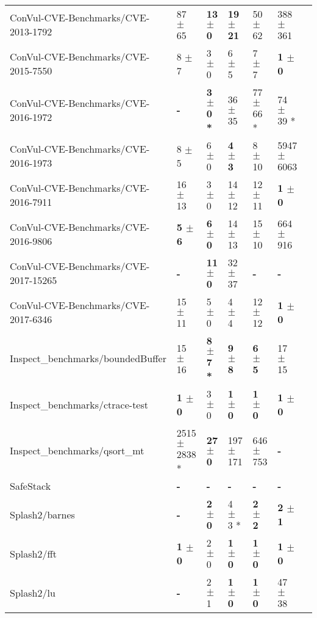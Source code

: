 \begin{table}
\begin{spacing}{1.5}
\begin{tabular}{lllllll}
ConVul-CVE-Benchmarks/CVE-2013-1792 & 87  $\pm$ 65  & \textbf{ 13  $\pm$ 0  } & \textbf{ 19  $\pm$ 21  } & 50  $\pm$ 62  & 388  $\pm$ 361  \\
ConVul-CVE-Benchmarks/CVE-2015-7550 & 8  $\pm$ 7  & 3  $\pm$ 0  & 6  $\pm$ 5  & 7  $\pm$ 7  & \textbf{ 1  $\pm$ 0  } \\
ConVul-CVE-Benchmarks/CVE-2016-1972 & \textbf{ - } & \textbf{ 3  $\pm$ 0 * } & 36  $\pm$ 35  & 77  $\pm$ 66 * & 74  $\pm$ 39 *  \\
ConVul-CVE-Benchmarks/CVE-2016-1973 & 8  $\pm$ 5  & 6  $\pm$ 0  & \textbf{ 4  $\pm$ 3  } & 8  $\pm$ 10  & 5947  $\pm$ 6063   \\
ConVul-CVE-Benchmarks/CVE-2016-7911 & 16  $\pm$ 13  & 3  $\pm$ 0  & 14  $\pm$ 12  & 12  $\pm$ 11  & \textbf{ 1  $\pm$ 0  }  \\
ConVul-CVE-Benchmarks/CVE-2016-9806 & \textbf{ 5  $\pm$ 6  } & \textbf{ 6  $\pm$ 0  } & 14  $\pm$ 13  & 15  $\pm$ 10  & 664  $\pm$ 916   \\
ConVul-CVE-Benchmarks/CVE-2017-15265 & \textbf{ - } & \textbf{ 11  $\pm$ 0  } & 32  $\pm$ 37  & \textbf{ - } & \textbf{ - }  \\
ConVul-CVE-Benchmarks/CVE-2017-6346 & 15  $\pm$ 11  & 5  $\pm$ 0  & 4  $\pm$ 4  & 12  $\pm$ 12  & \textbf{ 1  $\pm$ 0  }  \\
Inspect\_benchmarks/boundedBuffer & 15  $\pm$ 16  & \textbf{ 8  $\pm$ 7 * } & \textbf{ 9  $\pm$ 8  } & \textbf{ 6  $\pm$ 5  } & 17  $\pm$ 15   \\
Inspect\_benchmarks/ctrace-test & \textbf{ 1  $\pm$ 0  } & 3  $\pm$ 0  & \textbf{ 1  $\pm$ 0  } & \textbf{ 1  $\pm$ 0  } & \textbf{ 1  $\pm$ 0  }  \\
Inspect\_benchmarks/qsort\_mt & 2515  $\pm$ 2838 * & \textbf{ 27  $\pm$ 0  } & 197  $\pm$ 171  & 646  $\pm$ 753  & \textbf{ - }  \\
SafeStack & \textbf{ - } & \textbf{ - } & \textbf{ - } & \textbf{ - } & \textbf{ - }  \\
Splash2/barnes & \textbf{ - } & \textbf{ 2  $\pm$ 0  } & 4  $\pm$ 3 * & \textbf{ 2  $\pm$ 2  } & \textbf{ 2  $\pm$ 1  }  \\
Splash2/fft & \textbf{ 1  $\pm$ 0  } & 2  $\pm$ 0  & \textbf{ 1  $\pm$ 0  } & \textbf{ 1  $\pm$ 0  } & \textbf{ 1  $\pm$ 0  } \\
Splash2/lu & \textbf{ - } & 2  $\pm$ 1  & \textbf{ 1  $\pm$ 0  } & \textbf{ 1  $\pm$ 0  } & 47  $\pm$ 38   \\
\bottomrule
\end{tabular}
\end{spacing}
\end{table}


